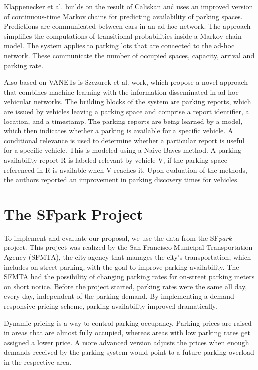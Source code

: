 	Klappenecker et al.\cite{klappenecker} builds on the result of Caliskan and uses an improved version of continuous-time Markov chains for predicting availability of parking spaces. Predictions are communicated between cars in an ad-hoc network. The approach simplifies the computations of transitional probabilities inside a Markov chain model. The system applies to parking lots that are connected to the ad-hoc network. These communicate the number of occupied spaces, capacity, arrival and parking rate. 
	
	Also based on VANETs is Szczurek et al.\cite{szczurek} work, which propose a novel approach that combines machine learning with the information disseminated in ad-hoc vehicular networks. The building blocks of the system are parking reports, which are issued by vehicles leaving a parking space and comprise a report identifier, a location, and a timestamp. The parking reports are being learned by a model, which then indicates whether a parking is available for a specific vehicle. A conditional relevance is used to determine whether a particular report is useful for a specific vehicle. This is modeled using a Naive Bayes method. A parking availability report R is labeled relevant by vehicle V, if the parking space referenced in R is available when V reaches it. Upon evaluation of the methods, the authors reported an improvement in parking discovery times for vehicles.
	
	\section{The SFpark Project}
	To implement and evaluate our proposal, we use the data from the SF\textit{park} project. This project was realized by the San Francisco Municipal Transportation Agency (SFMTA), the city agency that manages the city's transportation, which includes on-street parking\cite{sfpark, sfpark_evaluation}, with the goal to improve parking availability. The SFMTA had the possibility of changing parking rates for on-street parking meters on short notice. Before the project started, parking rates were the same all day, every day, independent of the parking demand. By implementing a demand responsive pricing scheme, parking availability improved dramatically.
	
	Dynamic pricing is a way to control parking occupancy. Parking prices are raised in areas that are almost fully occupied, whereas areas with low parking rates get assigned a lower price. A more advanced version adjusts the prices when enough demands received by the parking system would point to a future parking overload in the respective area.
	
